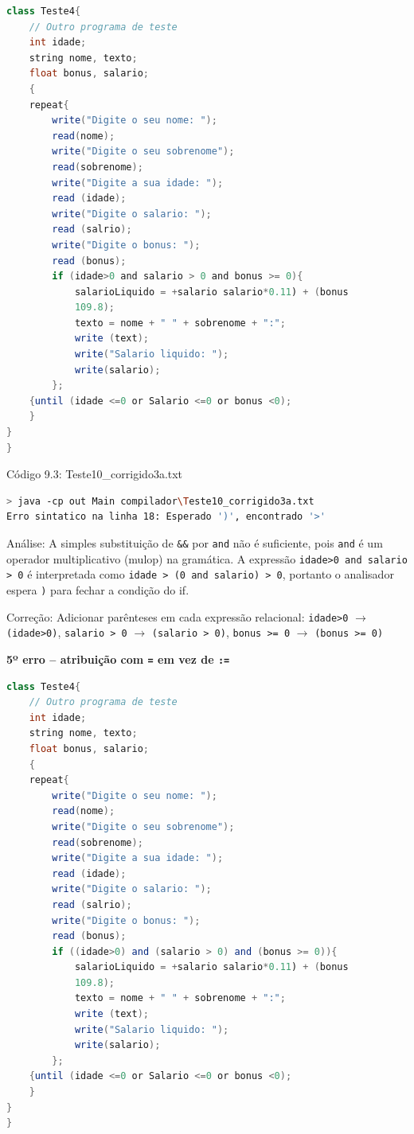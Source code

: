 \documentclass[12pt,a4paper]{article}
\begin{document}
\begin{lstlisting}[language=Java]
class Teste4{
    // Outro programa de teste
    int idade;
    string nome, texto;
    float bonus, salario;
    {
    repeat{
        write("Digite o seu nome: ");
        read(nome);
        write("Digite o seu sobrenome");
        read(sobrenome);
        write("Digite a sua idade: ");
        read (idade);
        write("Digite o salario: ");
        read (salrio);
        write("Digite o bonus: ");
        read (bonus);
        if (idade>0 and salario > 0 and bonus >= 0){
            salarioLiquido = +salario salario*0.11) + (bonus
            109.8);
            texto = nome + " " + sobrenome + ":";
            write (text);
            write("Salario liquido: ");
            write(salario);
        };
    {until (idade <=0 or Salario <=0 or bonus <0);
    }
}
}
\end{lstlisting}

Código 9.3: Teste10\_corrigido3a.txt

\begin{lstlisting}[language=bash]
> java -cp out Main compilador\Teste10_corrigido3a.txt
Erro sintatico na linha 18: Esperado ')', encontrado '>'
\end{lstlisting}

Análise: A simples substituição de \texttt{\&\&} por \texttt{and} não é suficiente, pois \texttt{and} é um operador multiplicativo (mulop) na gramática. A expressão \texttt{idade>0 and salario > 0} é interpretada como \texttt{idade > (0 and salario) > 0}, portanto o analisador espera \texttt{)} para fechar a condição do if.

Correção: Adicionar parênteses em cada expressão relacional: \texttt{idade>0} $\to$ \texttt{(idade>0)}, \texttt{salario > 0} $\to$ \texttt{(salario > 0)}, \texttt{bonus >= 0} $\to$ \texttt{(bonus >= 0)}

\textbf{5º erro -- atribuição com \texttt{=} em vez de \texttt{:=}}

\begin{lstlisting}[language=Java]
class Teste4{
    // Outro programa de teste
    int idade;
    string nome, texto;
    float bonus, salario;
    {
    repeat{
        write("Digite o seu nome: ");
        read(nome);
        write("Digite o seu sobrenome");
        read(sobrenome);
        write("Digite a sua idade: ");
        read (idade);
        write("Digite o salario: ");
        read (salrio);
        write("Digite o bonus: ");
        read (bonus);
        if ((idade>0) and (salario > 0) and (bonus >= 0)){
            salarioLiquido = +salario salario*0.11) + (bonus
            109.8);
            texto = nome + " " + sobrenome + ":";
            write (text);
            write("Salario liquido: ");
            write(salario);
        };
    {until (idade <=0 or Salario <=0 or bonus <0);
    }
}
}
\end{lstlisting}
\end{document}
